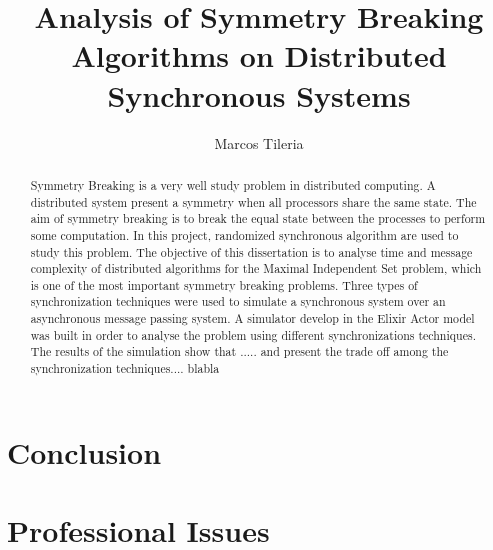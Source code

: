 \documentclass[11pt]{article} %
\title{Analysis of Symmetry Breaking Algorithms on Distributed Synchronous Systems}
\author{Marcos Tileria}
\theoremstyle{plain}
\theoremstyle{definition}
\begin{document}
\maketitle

\declaration

\begin{abstract}
  
 Symmetry Breaking is a very well study problem in distributed computing. A distributed system present a symmetry when all processors share the same state. The aim of symmetry breaking is to break the equal state between the processes to perform some computation. In this project, randomized synchronous algorithm  are used to study this problem. The objective of this dissertation is to analyse time and message complexity of distributed algorithms for the Maximal Independent Set problem, which is one of the most important symmetry breaking problems. Three types of synchronization techniques were used to simulate a synchronous system over an asynchronous message passing system. A simulator develop in the Elixir Actor model was built in order to analyse the problem using different synchronizations techniques. The results of the simulation show that ..... and present the trade off among the synchronization techniques.... blabla 
  
\end{abstract}




\newpage




\newpage


\newpage


\newpage


\newpage

\section{Conclusion}

\section{Professional Issues}



\end{document}
